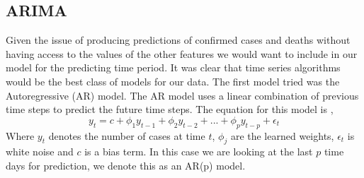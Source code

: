 \documentclass[sigconf,nonacm]{acmart}
\begin{document}
\subsection{ARIMA}
Given the issue of producing predictions of confirmed cases and deaths without
having access to the values of the other features we would want to include in 
our model for the predicting time period. It was clear that time series algorithms
would be the best class of models for our data. The first model tried was the
Autoregressive (AR) model. The AR model uses a linear combination of previous
time steps to predict the future time steps. The equation for this model is \cite{forecasting},
\begin{equation}
 y_t = c + \phi_1 y_{t-1} + \phi_2 y_{t-2} + ... + \phi_p y_{t-p} + \epsilon_t 
\end{equation}
Where $y_t$ denotes the number of cases at time $t$, $\phi_j$ are the learned weights,
 $\epsilon_t$ is white noise and $c$ is a bias term. In this case we are looking at the last $p$ time days
for prediction, we denote this as an AR(p) model. 
\end{document}
